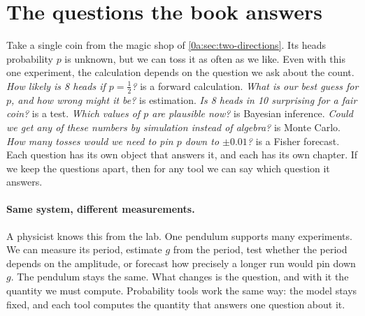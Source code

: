 \providecommand{\zeroaIconFisher}{\tikz[baseline=0.05cm,x=1cm,y=1cm]{%
  \draw[softgray,->] (0,0)--(1.0,0); \draw[softgray,->] (0,0)--(0,0.7);
  \draw[formblue,thick,rotate around={-35:(0.5,0.35)}] (0.5,0.35) ellipse (0.36 and 0.12);
  \fill[formblue] (0.5,0.35) circle (0.8pt);}}
\providecommand{\zeroaIconField}{\tikz[baseline=0.05cm,x=1cm,y=1cm]{%
  \draw[softgray,->] (0,0)--(1.0,0); \draw[softgray,->] (0,0)--(0,0.7);
  \draw[formblue,thick] plot[domain=0.05:0.95,samples=40,smooth]
    (\x,{0.12+0.45*exp(-((\x-0.3)^2)/(2*0.08^2))+0.2*exp(-((\x-0.62)^2)/(2*0.06^2))});}}
\providecommand{\zeroaIconTopo}{\tikz[baseline=0.05cm,x=1cm,y=1cm]{%
  \fill[bdryred!60] (0.15,0.45) circle (0.12);
  \fill[bdryred!60] (0.32,0.15) circle (0.1);
  \fill[bdryred!60,even odd rule] (0.72,0.35) circle (0.26) (0.72,0.35) circle (0.12);}}

\section{The questions the book answers}\label{0a:sec:questions}

Take a single coin from the magic shop of \cref{0a:sec:two-directions}.
Its heads probability $p$ is unknown, but we can toss it as often as we like.
Even with this one experiment, the calculation depends on the question we
ask about the count.
\emph{How likely is 8 heads if $p=\frac12$?} is a forward calculation.
\emph{What is our best guess for $p$, and how wrong might it be?} is
estimation. \emph{Is 8 heads in 10 surprising for a fair coin?} is a test.
\emph{Which values of $p$ are plausible now?} is Bayesian inference.
\emph{Could we get any of these numbers by simulation instead of algebra?} is
Monte Carlo. \emph{How many tosses would we need to pin $p$ down to $\pm 0.01$?}
is a Fisher forecast. Each question has its own object that answers it, and
each has its own chapter. If we keep the questions apart, then for any tool we
can say which question it answers.

\paragraph{Same system, different measurements.}
A physicist knows this from the lab. One pendulum supports many experiments.
We can measure its period, estimate $g$ from the period, test whether the
period depends on the amplitude, or forecast how precisely a longer run would
pin down $g$. The pendulum stays the same. What changes is the question, and
with it the quantity we must compute. Probability tools work the same way: the
model stays fixed, and each tool computes the quantity that answers one
question about it.

